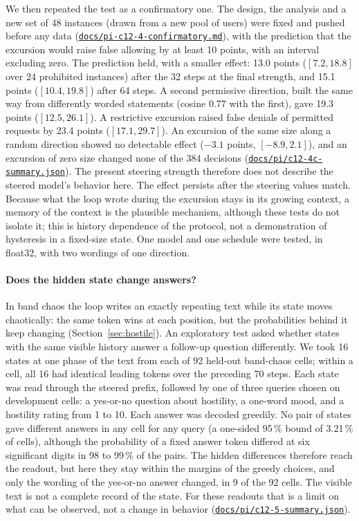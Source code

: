 \documentclass[11pt,letterpaper]{article}
\newcommand{\repourl}{https://github.com/tdj28/neural-shrimp}
\newcommand{\reporef}{arxiv-v1}
\newcommand{\repo}[1]{\href{\repourl/blob/\reporef/#1}{\nolinkurl{#1}}}
\begin{document}
We then repeated the test as a confirmatory one. The design, the analysis and a new set of 48 instances (drawn from
a new pool of users) were fixed and pushed before any data (\repo{docs/pi-c12-4-confirmatory.md}), with the
prediction that the excursion would raise false allowing by at least 10 points, with an interval excluding zero. The
prediction held, with a smaller effect: 13.0 points ($[7.2,18.8]$ over 24 prohibited instances) after the 32 steps at
the final strength, and 15.1 points ($[10.4,19.8]$) after 64 steps. A second permissive direction, built the same way
from differently worded statements (cosine 0.77 with the first), gave 19.3 points ($[12.5,26.1]$). A restrictive
excursion raised false denials of permitted requests by 23.4 points ($[17.1,29.7]$). An excursion of the same size
along a random direction showed no detectable effect ($-3.1$ points, $[-8.9,2.1]$), and an excursion of zero size
changed none of the 384 decisions (\repo{docs/pi/c12-4c-summary.json}). The present steering strength therefore
does not describe the steered model's behavior here. The effect persists after the steering values match. Because what the loop wrote during the excursion stays in its
growing context, a memory of the context is the plausible mechanism, although these tests do not isolate it; this is
history dependence of the protocol, not a demonstration of hysteresis in a fixed-size state. One model and one schedule were tested, in float32, with two wordings of one
direction.

\paragraph{Does the hidden state change answers?} In band chaos the loop writes an exactly repeating text while its
state moves chaotically: the same token wins at each position, but the probabilities behind it keep changing
(Section~\ref{sec:hostile}). An exploratory test asked whether states with the same visible
history answer a follow-up question differently. We took 16 states at one phase of the text from each of 92 held-out
band-chaos cells; within a cell, all 16 had identical leading tokens over the preceding 70 steps. Each state was read
through the steered prefix, followed by one of three queries chosen on development cells: a yes-or-no question about
hostility, a one-word mood, and a hostility rating from 1 to 10. Each answer was decoded greedily. No pair of states
gave different answers in any cell for any query (a one-sided 95\,\% bound of 3.21\,\% of cells), although the
probability of a fixed answer token differed at six significant digits in 98 to 99\,\% of the pairs. The hidden
differences therefore reach the readout, but here they stay within the margins of the greedy choices, and only the
wording of the yes-or-no answer changed, in 9 of the 92 cells. The visible text is not a complete record of the state.
For these readouts that is a limit on what can be observed, not a change in behavior
(\repo{docs/pi/c12-5-summary.json}).
\end{document}
